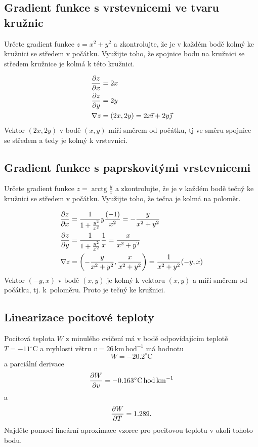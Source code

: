 \subsection{Gradient funkce s vrstevnicemi ve tvaru kružnic}

Určete gradient funkce $z=x^2+y^2$ a zkontrolujte, že je v každém bodě kolmý ke kružnici se středem v počátku. Využijte toho, že spojnice bodu na kružnici se středem kružnice je kolmá k této kružnici. 

\reseni
\begin{align*}
  \pdv{z}{x} &= 2x\\
  \pdv{z}{y} &= 2y\\
  \nabla z &= (2x, 2y) = 2x\vec \imath + 2y\vec \jmath
\end{align*}
Vektor $(2x,2y)$ v bodě $(x,y)$ míří směrem od počátku, tj ve směru spojnice se středem a tedy je kolmý k vrstevnici.
\konec



\subsection{Gradient funkce s paprskovitými vrstevnicemi}

Určete gradient funkce $z=\mathop{\mathrm{arctg}} \frac yx$ a zkontrolujte, že je v každém bodě tečný ke kružnici se středem v počátku. Využijte toho, že tečna je kolmá na poloměr.


\reseni
\begin{align*}
  \pdv{z}{x} &= \frac1{1+\frac {y^2}{x^2}}y\frac {(-1)}{x^2}=-\frac{y}{x^2+y^2}\\
  \pdv{z}{y} &= \frac1{1+\frac {y^2}{x^2}}\frac 1x=\frac{x}{x^2+y^2}\\
  \nabla z &=  \left(-\frac{y}{x^2+y^2},\frac{x}{x^2+y^2}\right)= \frac{1}{x^2+y^2} (-y,x)
\end{align*}
Vektor $(-y,x)$ v bodě $(x,y)$ je kolmý k vektoru $(x,y)$ a míří směrem od počátku, tj. k~poloměru. Proto je tečný ke kružnici.
\konec




\subsection{Linearizace pocitové teploty}

Pocitová teplota $W$ z minulého cvičení má v bodě odpovídajícím teplotě $T=-11{}^\circ\mathrm C$ a rcyhlosti větru $v=26\,\mathrm {km}\,\mathrm{hod}^{-1}$ má hodnotu $$W=-20.2 ^\circ\mathrm C$$ a parciální derivace $$\pdv{W}{v}=-0.163 ^\circ\mathrm C\, \mathrm {hod}\,\mathrm{km}^{-1}$$ a
$$\pdv{W}{T}=1.289.$$ Najděte pomocí lineární aproximace vzorec pro pocitovou teplotu v okolí tohoto bodu.

